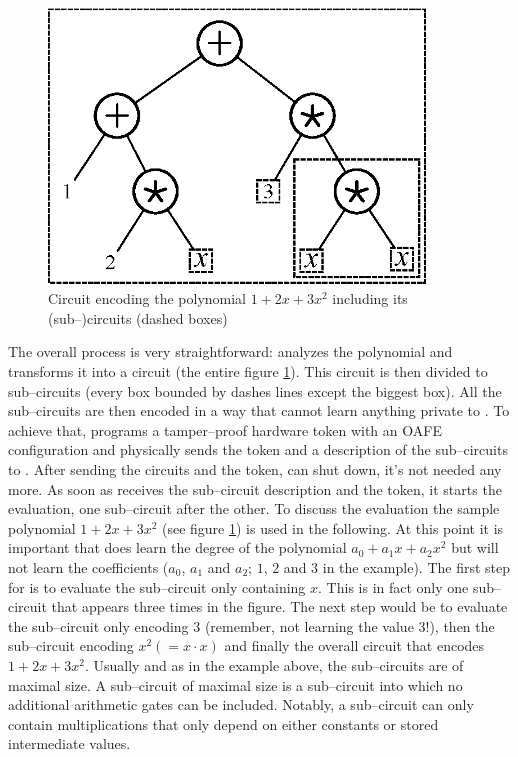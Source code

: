 \begin{figure}[htb]
  \centering
  \includegraphics[width=10cm]{images/sample-polynomial.eps}
  \caption{Circuit encoding the polynomial $1 + 2x + 3x^2$ including its
    (sub--)circuits (dashed boxes)}
  \label{fig:sample-poly}
\end{figure}

The overall process is very straightforward: \JWpOne{} analyzes the polynomial
and transforms it into a circuit (the entire figure \ref{fig:sample-poly}). This
circuit is then divided to sub--circuits (every box bounded by dashes lines
except the biggest box). All the sub--circuits are then encoded in a way that
\JWpTwo{} cannot learn anything private to \JWpOne{}. To achieve that, \JWpOne{}
programs a tamper--proof hardware token with an OAFE configuration and
physically sends the token and a description of the sub--circuits to \JWpTwo{}.
After sending the circuits and the token, \JWpOne{} can shut down, it's not
needed any more.  As soon as \JWpTwo{} receives the sub--circuit description and
the token, it starts the evaluation, one sub--circuit after the other. To
discuss the evaluation the sample polynomial $1 + 2x + 3x^2$ (see figure
\ref{fig:sample-poly}) is used in the following. At this point it is
important that \JWpTwo{} does learn the degree of the polynomial $a_0 + a_1x +
a_2x^2$ but will not learn the coefficients ($a_0$, $a_1$ and $a_2$; $1$, $2$
and $3$ in the example). The first step for \JWpTwo{} is to evaluate the
sub--circuit only containing $x$. This is in fact only one sub--circuit that
appears three times in the figure. The next step would be to evaluate the
sub--circuit only encoding $3$ (remember, not learning the value $3$!), then the
sub--circuit encoding $x^2 (= x \cdot x)$ and finally the overall circuit that
encodes $1 + 2x + 3x^2$.  Usually and as in the example above, the sub--circuits
are of maximal size. A sub--circuit of maximal size is a sub--circuit into which
no additional arithmetic gates can be included. Notably, a sub--circuit can only
contain multiplications that only depend on either constants or stored
intermediate values.

